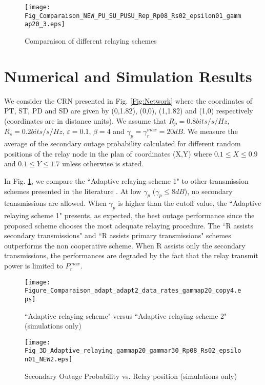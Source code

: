 \documentclass[conference,twocolumn]{IEEEtran}
\begin{document}
\begin{figure}
\centering
  \texttt{[image: Fig\_Comparaison\_NEW\_PU\_SU\_PUSU\_Rep\_Rp08\_Rs02\_epsilon01\_gammap20\_3.eps]}
  \caption{Comparaison of different relaying schemes}
  \label{Fig:Compare_schemes}
\end{figure}

\section{Numerical and Simulation Results}
We consider the CRN presented in Fig. \ref{Fig:Network} where the coordinates of PT, ST, PD and SD are given by (0,1.82), (0,0), (1,1.82) and (1,0) respectively (coordinates are in distance units). We assume that $R_p=0.8 bits/s/Hz$, $R_s=0.2 bits/s/Hz$, $\varepsilon=0.1$, $\beta=4$ and $\gamma_p=\gamma_r^{max}=20dB$. We measure the average of the secondary outage probability calculated for different random positions of the relay node in the plan of coordinates (X,Y) where $0.1 \leq X \leq 0.9$ and $0.1 \leq Y \leq 1.7$ unless otherwise is stated.



In Fig. \ref{Fig:Compare_schemes}, we compare the ``Adaptive
relaying scheme 1" to other transmission schemes presented in the literature \cite{Zou,Jaafar_Globecom}. At low $\gamma_p$ ($\gamma_p \leq 8dB$), no secondary transmissions are allowed. When $\gamma_p$ is higher than the cutoff value, the ``Adaptive relaying scheme 1" presents, as expected, the best outage performance since the proposed scheme chooses the most adequate relaying procedure. The ``R assists secondary transmissions" and ``R assists primary transmissions" schemes outperforms the non cooperative scheme. When R assists only the secondary transmissions, the performances are degraded by the fact that the relay transmit power is limited to $P_r^{max}$.



\begin{figure}
\centering
  \texttt{[image: Figure\_Comparaison\_adapt\_adapt2\_data\_rates\_gammap20\_copy4.eps]}
  \caption{``Adaptive relaying scheme" versus ``Adaptive relaying scheme 2" (simulations only)}
  \label{Fig:compare_adapt12}
\end{figure}
\begin{figure}
\centering
  \texttt{[image: Fig\_3D\_Adaptive\_relaying\_gammap20\_gammar30\_Rp08\_Rs02\_epsilon01\_NEW2.eps]}
  \caption{Secondary Outage Probability vs. Relay position (simulations only)}
  \label{Fig:3D}
\end{figure}
\end{document}
